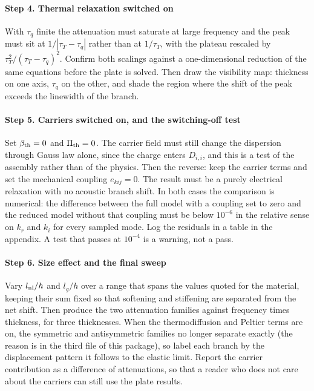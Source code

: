 \documentclass[11pt]{article}
\begin{document}
\paragraph{Step 4. Thermal relaxation switched on} With $\tau_q$ finite the attenuation must saturate at
large frequency and the peak must sit at $1/|\tau_T-\tau_q|$ rather than at $1/\tau_T$, with the plateau
rescaled by $\tau_T^2/(\tau_T-\tau_q)^2$. Confirm both scalings against a one-dimensional reduction of the
same equations before the plate is solved. Then draw the visibility map: thickness on one axis, $\tau_q$ on
the other, and shade the region where the shift of the peak exceeds the linewidth of the branch.

\paragraph{Step 5. Carriers switched on, and the switching-off test} Set $\beta_{\rm th}=0$ and $\Pi_{\rm th}=0$.
The carrier field must still change the dispersion through Gauss law alone, since the charge enters
$D_{i,i}$, and this is a test of the assembly rather than of the physics. Then the reverse: keep the
carrier terms and set the mechanical coupling $e_{kij}=0$. The result must be a purely electrical
relaxation with no acoustic branch shift. In both cases the comparison is numerical: the difference between
the full model with a coupling set to zero and the reduced model without that coupling must be below
$10^{-6}$ in the relative sense on $k_r$ and $k_i$ for every sampled mode. Log the residuals in a table in
the appendix. A test that passes at $10^{-4}$ is a warning, not a pass.

\paragraph{Step 6. Size effect and the final sweep} Vary $l_{\rm nl}/h$ and $l_g/h$ over a range that spans
the values quoted for the material, keeping their sum fixed so that softening and stiffening are separated
from the net shift. Then produce the two attenuation families against frequency times thickness, for three thicknesses. When the thermodiffusion and Peltier terms are on, the symmetric and antisymmetric families no longer separate exactly (the reason is in the third file of this package), so label each branch by the displacement pattern it follows to the elastic limit. Report the carrier contribution as a difference of
attenuations, so that a reader who does not care about the carriers can still use the plate results.
\end{document}
